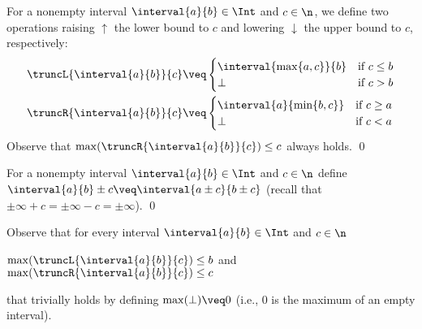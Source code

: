 \begin{definition}
  \label{de:trunc}
  For a nonempty interval \(\interval{a}{b} \in \Int\) and \(c \in \n\), we define
  two operations raising \(\uparrow\) the lower bound to \(c\) and lowering \(\downarrow\) the upper
  bound to \(c\), respectively:
  \begin{align*}
    &\truncL{\interval{a}{b}}{c} \veq 
      \begin{cases} 
        \interval{\max\{a,c\}}{b} & \text{if } c\leq b\\
        \bot & \text{if } c > b
      \end{cases}
    \\
    &\truncR{\interval{a}{b}}{c} \veq 
      \begin{cases}   
        \interval{a}{\min\{b,c\}} & \text{if } c\geq a\\
        \bot & \text{if } c < a 
      \end{cases} 
  \end{align*}
  Observe that \(\max(\truncR{\interval{a}{b}}{c})\leq c\) always holds. \qed   
\end{definition}

\begin{definition}
  \label{de:add}
  For a nonempty interval \(\interval{a}{b} \in \Int\) and \(c \in \n\) define
  \(\interval{a}{b} \pm c \veq \interval{a\pm c}{b\pm c}\) (recall that \(\pm \infty + c = \pm\infty - c = \pm\infty\)).  
  \qed
\end{definition}


Observe that for every interval \(\interval{a}{b} \in \Int\) and
\(c \in \n\)
\begin{center}
  \(\max(\truncL{\interval{a}{b}}{c}) \leq b\)
  \qquad and \qquad
  \(\max(\truncR{\interval{a}{b}}{c}) \leq c\)
\end{center}
that trivially holds by 
defining \(\max (\bot)  \veq 0\) (i.e., \(0\) is the maximum of
an empty interval).


